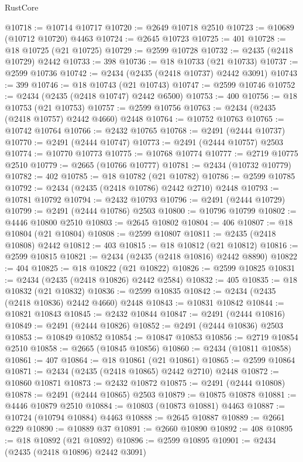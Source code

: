 \begin{lexlean}{RustCore}
\begin{coremodule}
@10718 := @10714 @10717
@10720 := @2649 @10718 @2510
@10723 := @10689 (@10712 @10720) @4463
@10724 := @2645 @10723
@10725 := 401
@10728 := @18 @10725 (@21 @10725)
@10729 := @2599 @10728
@10732 := @2435 (@2418 @10729) @2442
@10733 := 398
@10736 := @18 @10733 (@21 @10733)
@10737 := @2599 @10736
@10742 := @2434 (@2435 (@2418 @10737) @2442 @3091)
@10743 := 399
@10746 := @18 @10743 (@21 @10743)
@10747 := @2599 @10746
@10752 := @2434 (@2435 (@2418 @10747) @2442 @6500)
@10753 := 400
@10756 := @18 @10753 (@21 @10753)
@10757 := @2599 @10756
@10763 := @2434 (@2435 (@2418 @10757) @2442 @4660) @2448
@10764 := @10752 @10763
@10765 := @10742 @10764
@10766 := @2432 @10765
@10768 := @2491 (@2444 @10737)
@10770 := @2491 (@2444 @10747)
@10773 := @2491 (@2444 @10757) @2503
@10774 := @10770 @10773
@10775 := @10768 @10774
@10777 := @2719 @10775 @2510
@10779 := @2665 (@10766 @10777)
@10781 := @2434 (@10732 @10779)
@10782 := 402
@10785 := @18 @10782 (@21 @10782)
@10786 := @2599 @10785
@10792 := @2434 (@2435 (@2418 @10786) @2442 @2710) @2448
@10793 := @10781 @10792
@10794 := @2432 @10793
@10796 := @2491 (@2444 @10729)
@10799 := @2491 (@2444 @10786) @2503
@10800 := @10796 @10799
@10802 := @4446 @10800 @2510
@10803 := @2645 @10802
@10804 := 406
@10807 := @18 @10804 (@21 @10804)
@10808 := @2599 @10807
@10811 := @2435 (@2418 @10808) @2442
@10812 := 403
@10815 := @18 @10812 (@21 @10812)
@10816 := @2599 @10815
@10821 := @2434 (@2435 (@2418 @10816) @2442 @8890)
@10822 := 404
@10825 := @18 @10822 (@21 @10822)
@10826 := @2599 @10825
@10831 := @2434 (@2435 (@2418 @10826) @2442 @2584)
@10832 := 405
@10835 := @18 @10832 (@21 @10832)
@10836 := @2599 @10835
@10842 := @2434 (@2435 (@2418 @10836) @2442 @4660) @2448
@10843 := @10831 @10842
@10844 := @10821 @10843
@10845 := @2432 @10844
@10847 := @2491 (@2444 @10816)
@10849 := @2491 (@2444 @10826)
@10852 := @2491 (@2444 @10836) @2503
@10853 := @10849 @10852
@10854 := @10847 @10853
@10856 := @2719 @10854 @2510
@10858 := @2665 (@10845 @10856)
@10860 := @2434 (@10811 @10858)
@10861 := 407
@10864 := @18 @10861 (@21 @10861)
@10865 := @2599 @10864
@10871 := @2434 (@2435 (@2418 @10865) @2442 @2710) @2448
@10872 := @10860 @10871
@10873 := @2432 @10872
@10875 := @2491 (@2444 @10808)
@10878 := @2491 (@2444 @10865) @2503
@10879 := @10875 @10878
@10881 := @4446 @10879 @2510
@10884 := @10803 (@10873 @10881) @4463
@10887 := @10724 (@10794 @10884) @4463
@10888 := @2645 @10887
@10889 := @2661 @229
@10890 := @10889 @37
@10891 := @2660 @10890
@10892 := 408
@10895 := @18 @10892 (@21 @10892)
@10896 := @2599 @10895
@10901 := @2434 (@2435 (@2418 @10896) @2442 @3091)

\end{coremodule}
\end{lexlean}
